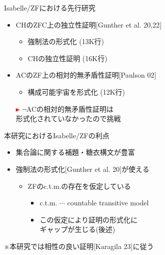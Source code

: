 \documentclass[17pt,aspectratio=169]{beamer}
\begin{document}


\begin{frame}{Isabelle/ZFにおける先行研究}
 
    \begin{itemize}[itemsep=8pt]
        \vspace{10pt}
        \item CHのZFC上の独立性証明{\small [Gunther et al. 20,22]}
            \vspace{3pt}
              {\small \begin{itemize}
                \item 強制法の形式化 (13K行)
                \item CHの独立性証明 (16K行)
              \end{itemize} }

        \item ACのZF上の相対的無矛盾性証明{\small [Paulson 02]}
              {\small \begin{itemize}
                      \item 構成可能宇宙を形式化 (12K行)
                  \end{itemize} }
    \end{itemize}
    \begin{itemize}
        \item [\textcolor{red}{$\blacktriangleright$}] $\neg$ACの相対的無矛盾性証明は\\
        形式化されていなかったので挑戦
    \end{itemize}
\end{frame}

\begin{frame}{本研究におけるIsabelle/ZFの利点}
    \begin{itemize}
        \item 集合論に関する補題・糖衣構文が豊富
        \item 強制法の形式化{\small [Gunther et al. 20]}が使える
        {\small \begin{itemize}
            \item ZFのc.t.m.の存在を仮定している
            \begin{itemize}
                \item c.t.m. $\cdots$ countable transitive model
                \item この仮定により証明の形式化に\\ギャップが生じる(後述)
            \end{itemize}
        \end{itemize}}
    \end{itemize}
    ※本研究では相性の良い証明{\small [Karagila 23]}に従う
\end{frame}
\end{document}
